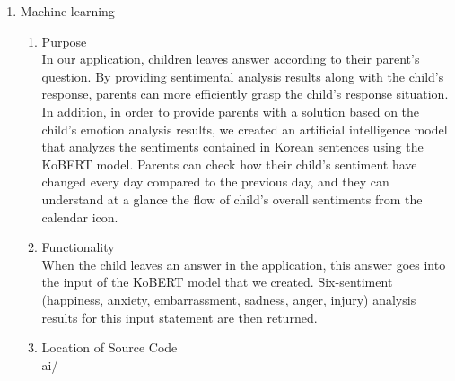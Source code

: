 \documentclass[conference]{IEEEtran}
\begin{document}
\begin{enumerate}
    \item Machine learning
        \begin{enumerate}
            \item Purpose
            \\In our application, children leaves answer according to their parent’s question. By providing sentimental analysis results along with the child's response, parents can more efficiently grasp the child's response situation. In addition, in order to provide parents with a solution based on the child's emotion analysis results, we created an artificial intelligence model that analyzes the sentiments contained in Korean sentences using the KoBERT model. Parents can check how their child's sentiment have changed every day compared to the previous day, and they can understand at a glance the flow of child's overall sentiments from the calendar icon.
            
            \item Functionality
            \\When the child leaves an answer in the application, this answer goes into the input of the KoBERT model that we created. Six-sentiment (happiness, anxiety, embarrassment, sadness, anger, injury) analysis results for this input statement are then returned.
            
            \item Location of Source Code
            \\ai/
            

\end{enumerate}
\end{enumerate}
\end{document}
